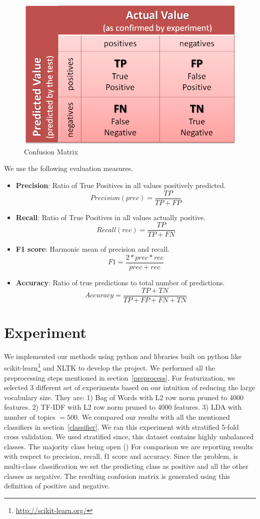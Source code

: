 \documentclass{article} %
\begin{document}
\begin{figure}[!htpb]
    \centering
    \includegraphics[scale=0.25]{figs/cmatrix}
    \caption{Confusion Matrix}
    \label{fig:cmatrix}
\end{figure}

We use the following evaluation measures.
\begin{itemize}
    \item \textbf{Precision}: Ratio of True Positives in all values positively predicted.
    \[Precision(prec) = \dfrac{TP}{TP + FP}\]
    \item \textbf{Recall}: Ratio of True Positives in all values actually positive.
    \[Recall(rec) = \dfrac{TP}{TP + FN}\]
    \item \textbf{F1 score}: Harmonic mean of precision and recall.
    \[F1 = \dfrac{2*prec*rec}{prec + rec}\]
    \item \textbf{Accuracy}: Ratio of true predictions to total number of predictions.\\
    \[Accuracy = \dfrac{TP + TN}{TP + FP + FN + TN}\]
\end{itemize}


\section{Experiment}
We implemented our methods using python and libraries built on python like scikit-learn\footnote{\url{http://scikit-learn.org/}} and NLTK to develop the project. We performed all the preprocessing steps mentioned in section~\ref{preprocess}. For featurization, we selected 3 different set of experiments based on our intuition of reducing the large vocabulary size. They are: 1) Bag of Words with L2 row norm pruned to 4000 features. 2) TF-IDF with L2 row norm pruned to 4000 features. 3) LDA with number of topics $= 500$. We compared our results with all the mentioned classifiers in section~\ref{classifier}. We ran this experiment with stratified 5-fold cross validation. We used stratified since, this dataset contains highly unbalanced classes. The majority class being open () For comparison we are reporting results with respect to precision, recall, f1 score and accuracy. Since the problem, is multi-class classification we set the predicting class as positive and all the other classes as negative. The resulting confusion matrix is generated using this definition of positive and negative.
\end{document}
